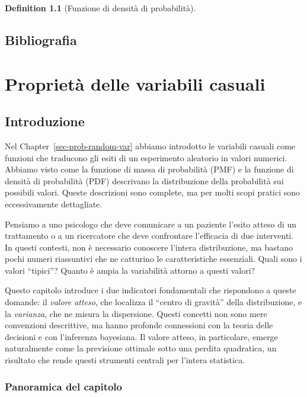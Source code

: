 \documentclass[
  letterpaper,
  DIV=11,
  numbers=noendperiod,
  oneside]{scrreprt}
\theoremstyle{definition}
\theoremstyle{plain}
\theoremstyle{definition}
\newtheorem{definition}{Definition}[chapter]
\theoremstyle{remark}
\begin{document}
\begin{definition}[Funzione di densità di
probabilità]
\begin{tcolorbox}
\end{tcolorbox}

\section*{Bibliografia}\label{bibliografia-4}


\chapter{Proprietà delle variabili
casuali}\label{sec-prob-random-var-properties}

\section*{Introduzione}\label{introduzione-8}


Nel Chapter~\ref{sec-prob-random-var} abbiamo introdotto le variabili
casuali come funzioni che traducono gli esiti di un esperimento
aleatorio in valori numerici. Abbiamo visto come la funzione di massa di
probabilità (PMF) e la funzione di densità di probabilità (PDF)
descrivano la distribuzione della probabilità sui possibili valori.
Queste descrizioni sono complete, ma per molti scopi pratici sono
eccessivamente dettagliate.

Pensiamo a uno psicologo che deve comunicare a un paziente l'esito
atteso di un trattamento o a un ricercatore che deve confrontare
l'efficacia di due interventi. In questi contesti, non è necessario
conoscere l'intera distribuzione, ma bastano pochi numeri riassuntivi
che ne catturino le caratteristiche essenziali. Quali sono i valori
``tipici''? Quanto è ampia la variabilità attorno a questi valori?

Questo capitolo introduce i due indicatori fondamentali che rispondono a
queste domande: il \emph{valore atteso}, che localizza il ``centro di
gravità'' della distribuzione, e la \emph{varianza}, che ne misura la
dispersione. Questi concetti non sono mere convenzioni descrittive, ma
hanno profonde connessioni con la teoria delle decisioni e con
l'inferenza bayesiana. Il valore atteso, in particolare, emerge
naturalmente come la previsione ottimale sotto una perdita quadratica,
un risultato che rende questi strumenti centrali per l'intera
statistica.

\subsection*{Panoramica del capitolo}\label{panoramica-del-capitolo-7}


\end{definition}
\end{document}
